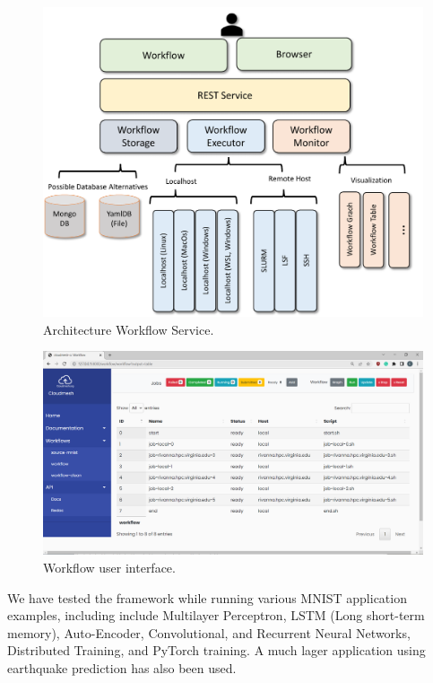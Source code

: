 \begin{figure}[htb]
    \centering
    \includegraphics[width=1.0\columnwidth]{images/cc.pdf}
    \caption{Architecture Workflow Service.}\label{fig:cc-2}
\end{figure}

\begin{figure}[htb]
    \centering
    \includegraphics[width=1.0\columnwidth]{images/cc-1.png}
    \caption{Workflow user interface.}\label{fig:cc-3}
\end{figure}

We have tested the framework while running various MNIST application examples, including include Multilayer Perceptron, LSTM (Long short-term memory), Auto-Encoder, Convolutional, and Recurrent Neural Networks, Distributed Training, and PyTorch training. 
A much lager application using earthquake prediction has also been used.

